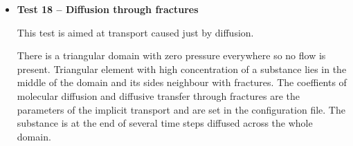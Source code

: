 \documentclass[12pt,a4paper]{report}
\begin{document}
\begin{itemize}

\item \textbf{Test 18 -- Diffusion through fractures}

This test is aimed at transport caused just by diffusion. 

There is a triangular domain with zero pressure everywhere so no flow is present. Triangular element with high concentration of a substance lies in the middle of the domain and its sides neighbour with fractures.
The coeffients of molecular diffusion and diffusive transfer through fractures are the parameters of the implicit transport and are set in the configuration file.
The substance is at the end of several time steps diffused across the whole domain.

\end{itemize}

\end{document}
